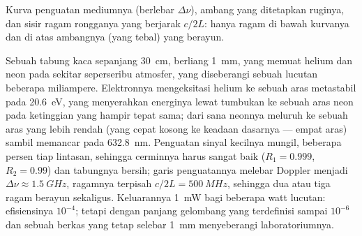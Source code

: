 \begin{omfigure}

{\small Kurva penguatan mediumnya (berlebar $\Delta\nu$), ambang
yang ditetapkan ruginya, dan sisir ragam rongganya yang berjarak $c/2L$: hanya
ragam di bawah kurvanya dan di atas ambangnya (yang tebal) yang berayun.}
\end{omfigure}

\begin{example}\label{ex:b2:laser:hene}
Sebuah tabung kaca sepanjang \qty{30}{cm}, berliang \qty{1}{mm}, yang memuat helium dan
neon pada sekitar seperseribu atmosfer, yang diseberangi sebuah lucutan
beberapa miliampere. Elektronnya mengeksitasi helium ke sebuah aras metastabil pada
\qty{20.6}{eV}, yang menyerahkan energinya lewat tumbukan ke sebuah aras neon pada
ketinggian yang hampir tepat sama; dari sana neonnya meluruh ke sebuah aras yang lebih rendah
(yang cepat kosong ke keadaan dasarnya --- empat aras) sambil memancar pada
\qty{632.8}{nm}. Penguatan sinyal kecilnya mungil, beberapa persen tiap
lintasan, sehingga cerminnya harus sangat baik ($R_1 = 0.999$, $R_2 = 0.99$)
dan tabungnya bersih; garis penguatannya melebar Doppler menjadi
$\Delta\nu \approx \qty{1.5}{GHz}$, ragamnya terpisah $c/2L = \qty{500}{MHz}$,
sehingga dua atau tiga ragam berayun sekaligus. Keluarannya \qty{1}{mW} bagi
beberapa watt lucutan: efisiensinya $10^{-4}$; tetapi dengan panjang gelombang yang
terdefinisi sampai $10^{-6}$ dan sebuah berkas yang tetap selebar \qty{1}{mm} menyeberangi
laboratoriumnya.
\end{example}

